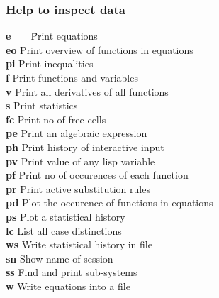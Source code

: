 \documentclass[12pt]{article}
\begin{document}
\subsubsection{Help to inspect data}
\begin{tabbing}
  {\bf e}\ \ \ \ \= Print equations          \\
  {\bf eo}   \> Print overview of functions in equations  \\
  {\bf pi}   \> Print inequalities  \\
  {\bf f}    \> Print functions and variables        \\
  {\bf v}    \> Print all derivatives of all functions  \\
  {\bf s}    \> Print statistics                  \\
  {\bf fc}   \> Print no of free cells  \\
  {\bf pe}   \> Print an algebraic expression \\
  {\bf ph}   \> Print history of interactive input \\
  {\bf pv}   \> Print value of any lisp variable \\
  {\bf pf}   \> Print no of occurences of each function \\
  {\bf pr}   \> Print active substitution rules \\
  {\bf pd}   \> Plot the occurence of functions in equations \\
  {\bf ps}   \> Plot a statistical history \\
  {\bf lc}   \> List all case distinctions \\
  {\bf ws}   \> Write statistical history in file \\
  {\bf sn}   \> Show name of session \\
  {\bf ss}   \> Find and print sub-systems \\
  {\bf w}    \> Write equations into a file
\end{tabbing}
\end{document}
